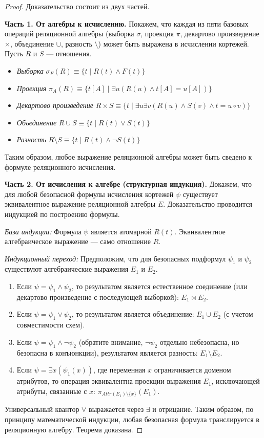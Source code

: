 \documentclass[12pt, a4paper]{article}
\begin{document}
\begin{proof}
Доказательство состоит из двух частей.

\textbf{Часть 1. От алгебры к исчислению.}
Покажем, что каждая из пяти базовых операций реляционной алгебры (выборка $\sigma$, проекция $\pi$, декартово произведение $\times$, объединение $\cup$, разность $\setminus$) может быть выражена в исчислении кортежей. Пусть $R$ и $S$ — отношения.
\begin{itemize}
    \item \textit{Выборка} $\sigma_F(R) \equiv \{ t \mid R(t) \land F(t) \}$
    \item \textit{Проекция} $\pi_{A}(R) \equiv \{ t[A] \mid \exists u (R(u) \land t[A] = u[A]) \}$
    \item \textit{Декартово произведение} $R \times S \equiv \{ t \mid \exists u \exists v (R(u) \land S(v) \land t = u \circ v) \}$
    \item \textit{Объединение} $R \cup S \equiv \{ t \mid R(t) \lor S(t) \}$
    \item \textit{Разность} $R \setminus S \equiv \{ t \mid R(t) \land \neg S(t) \}$
\end{itemize}
Таким образом, любое выражение реляционной алгебры может быть сведено к формуле реляционного исчисления.

\textbf{Часть 2. От исчисления к алгебре (структурная индукция).}
Докажем, что для любой безопасной формулы исчисления кортежей $\psi$ существует эквивалентное выражение реляционной алгебры $E$. Доказательство проводится индукцией по построению формулы.

\textit{База индукции:} Формула $\psi$ является атомарной $R(t)$. Эквивалентное алгебраическое выражение — само отношение $R$.

\textit{Индукционный переход:} Предположим, что для безопасных подформул $\psi_1$ и $\psi_2$ существуют алгебраические выражения $E_1$ и $E_2$.
\begin{enumerate}
    \item Если $\psi = \psi_1 \land \psi_2$, то результатом является естественное соединение (или декартово произведение с последующей выборкой): $E_1 \bowtie E_2$.
    \item Если $\psi = \psi_1 \lor \psi_2$, то результатом является объединение: $E_1 \cup E_2$ (с учетом совместимости схем).
    \item Если $\psi = \psi_1 \land \neg \psi_2$ (обратите внимание, $\neg \psi_2$ отдельно небезопасна, но безопасна в конъюнкции), результатом является разность: $E_1 \setminus E_2$.
    \item Если $\psi = \exists x (\psi_1(x))$, где переменная $x$ ограничивается доменом атрибутов, то операция эквивалентна проекции выражения $E_1$, исключающей атрибуты, связанные с $x$: $\pi_{Attr(E_1) \setminus \{x\}}(E_1)$.
\end{enumerate}
Универсальный квантор $\forall$ выражается через $\exists$ и отрицание. Таким образом, по принципу математической индукции, любая безопасная формула транслируется в реляционную алгебру. Теорема доказана.
\end{proof}
\end{document}
